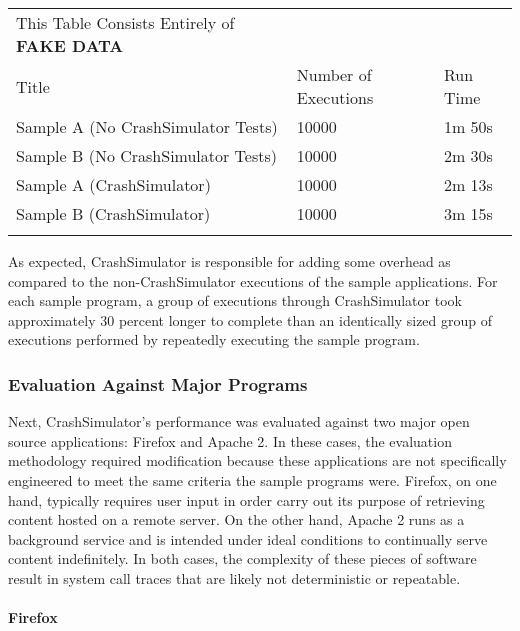             \begin{tabular} {l  l  l}
                \toprule{}
                This Table Consists Entirely of \textbf{FAKE DATA} \\
                Title & Number of Executions & Run Time \\
                Sample A (No CrashSimulator Tests) & 10000 & 1m 50s \\
                Sample B (No CrashSimulator Tests) & 10000 & 2m 30s \\
                Sample A (CrashSimulator) & 10000 & 2m 13s \\
                Sample B (CrashSimulator) & 10000 & 3m 15s \\
                \bottomrule{}
            \end{tabular}

            As expected, CrashSimulator is responsible for adding some overhead as compared to the non-CrashSimulator
            executions of the sample applications. For each sample program, a group of executions through CrashSimulator
            took approximately 30 percent longer to complete than an identically sized group of executions performed by
            repeatedly executing the sample program.

        \subsubsection{Evaluation Against Major Programs}

            Next, CrashSimulator's performance was evaluated against two major open source applications: Firefox and
            Apache 2. In these cases, the evaluation methodology required modification because these applications are
            not specifically engineered to meet the same criteria the sample programs were. Firefox, on one hand,
            typically requires user input in order carry out its purpose of retrieving content hosted on a remote
            server. On the other hand, Apache 2 runs as a background service and is intended under ideal conditions to
            continually serve content indefinitely. In both cases, the complexity of these pieces of software result in
            system call traces that are likely not deterministic or repeatable.

            \paragraph{Firefox}


